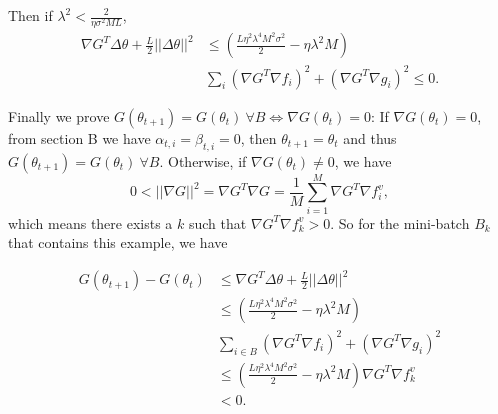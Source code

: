 \documentclass{article}
\begin{document}
Then if $\lambda^2 < \frac{2}{\eta \sigma^2 ML}$, 
\begin{align}
\nabla G^T \Delta \theta+\frac{L}{2}||\Delta \theta||^2&\leq (\frac{L\eta^2\lambda^4M^2\sigma^2}{2}-\eta\lambda^2M) \\&
\sum_i(\nabla G^T \nabla f_i)^2+(\nabla G^T \nabla g_i)^2\leq 0.
\end{align}

Finally we prove $G(\theta_{t+1})=G(\theta_t)\ \forall B \Leftrightarrow \nabla G(\theta_t)=0$: 
If $\nabla G(\theta_t)=0$, from section B we have $\alpha_{t,i}=\beta_{t,i}=0$, then $\theta_{t+1}=\theta_t$ and thus $G(\theta_{t+1})=G(\theta_t)\ \forall B$. Otherwise, if $\nabla G(\theta_t)\neq 0$, we have 
\begin{equation}
    0<||\nabla G||^2=\nabla G^T \nabla G = \frac{1}{M}\sum_{i=1}^M\nabla G^T \nabla f_i^v,
\end{equation}
which means there exists a $k$ such that $\nabla G^T\nabla f_k^v>0$. So for the mini-batch $B_k$ that contains this example, we have

\begin{align}
    G(\theta_{t+1})-G(\theta_t)&\leq \nabla G^T\Delta\theta+\frac{L}{2}||\Delta\theta||^2 \\
    &\leq (\frac{L\eta^2\lambda^4M^2\sigma^2}{2}-\eta\lambda^2M)\\
    &\sum_{i\in B}(\nabla G^T\nabla f_i)^2+(\nabla G^T\nabla g_i)^2 \\
    &\leq (\frac{L\eta^2\lambda^4M^2\sigma^2}{2}-\eta\lambda^2M) \nabla G^T \nabla f_k^v \\
    &<0.
\end{align}





{\small
	
}
\end{document}
